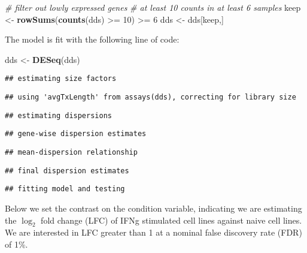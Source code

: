 \documentclass[
]{article}
\newenvironment{Shaded}{}{}
\newcommand{\CommentTok}[1]{\textcolor[rgb]{0.38,0.63,0.69}{\textit{#1}}}
\newcommand{\DecValTok}[1]{\textcolor[rgb]{0.25,0.63,0.44}{#1}}
\newcommand{\KeywordTok}[1]{\textcolor[rgb]{0.00,0.44,0.13}{\textbf{#1}}}
\newcommand{\NormalTok}[1]{#1}
\newcommand{\OperatorTok}[1]{\textcolor[rgb]{0.40,0.40,0.40}{#1}}
\newcommand{\StringTok}[1]{\textcolor[rgb]{0.25,0.44,0.63}{#1}}
\begin{document}
\begin{Shaded}
\begin{Highlighting}[]
\CommentTok{# filter out lowly expressed genes}
\CommentTok{# at least 10 counts in at least 6 samples}
\NormalTok{keep <-}\StringTok{ }\KeywordTok{rowSums}\NormalTok{(}\KeywordTok{counts}\NormalTok{(dds) }\OperatorTok{>=}\StringTok{ }\DecValTok{10}\NormalTok{) }\OperatorTok{>=}\StringTok{ }\DecValTok{6}
\NormalTok{dds <-}\StringTok{ }\NormalTok{dds[keep,]}
\end{Highlighting}
\end{Shaded}

The model is fit with the following line of code:

\begin{Shaded}
\begin{Highlighting}[]
\NormalTok{dds <-}\StringTok{ }\KeywordTok{DESeq}\NormalTok{(dds)}
\end{Highlighting}
\end{Shaded}

\begin{verbatim}
## estimating size factors
\end{verbatim}

\begin{verbatim}
## using 'avgTxLength' from assays(dds), correcting for library size
\end{verbatim}

\begin{verbatim}
## estimating dispersions
\end{verbatim}

\begin{verbatim}
## gene-wise dispersion estimates
\end{verbatim}

\begin{verbatim}
## mean-dispersion relationship
\end{verbatim}

\begin{verbatim}
## final dispersion estimates
\end{verbatim}

\begin{verbatim}
## fitting model and testing
\end{verbatim}

Below we set the contrast on the condition variable, indicating we are
estimating the \(\log_2\) fold change (LFC) of IFNg stimulated cell lines against naive cell
lines. We are interested in LFC greater than 1 at a nominal false discovery
rate (FDR) of 1\%.
\end{document}
